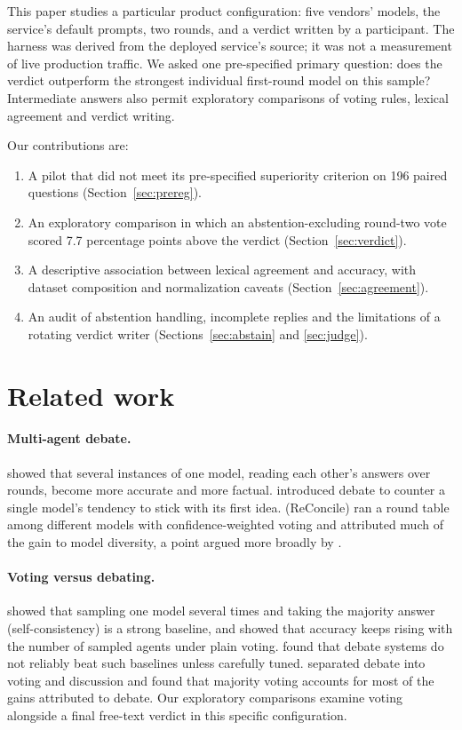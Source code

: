 \documentclass[11pt]{article}
\begin{document}
This paper studies a particular product configuration: five vendors' models, the service's default prompts, two rounds, and a verdict written by a participant. The harness was derived from the deployed service's source; it was not a measurement of live production traffic. We asked one pre-specified primary question: does the verdict outperform the strongest individual first-round model on this sample? Intermediate answers also permit exploratory comparisons of voting rules, lexical agreement and verdict writing.

Our contributions are:
\begin{enumerate}
  \item A pilot that did not meet its pre-specified superiority criterion on 196 paired questions (Section~\ref{sec:prereg}).
  \item An exploratory comparison in which an abstention-excluding round-two vote scored 7.7 percentage points above the verdict (Section~\ref{sec:verdict}).
  \item A descriptive association between lexical agreement and accuracy, with dataset composition and normalization caveats (Section~\ref{sec:agreement}).
  \item An audit of abstention handling, incomplete replies and the limitations of a rotating verdict writer (Sections~\ref{sec:abstain} and \ref{sec:judge}).
\end{enumerate}

\section{Related work}

\paragraph{Multi-agent debate.} \citet{du2023} showed that several instances of one model, reading each other's answers over rounds, become more accurate and more factual. \citet{liang2023} introduced debate to counter a single model's tendency to stick with its first idea. \citet{chen2024reconcile} (ReConcile) ran a round table among different models with confidence-weighted voting and attributed much of the gain to model diversity, a point argued more broadly by \citet{zhang2025stop}.

\paragraph{Voting versus debating.} \citet{wang2023sc} showed that sampling one model several times and taking the majority answer (self-consistency) is a strong baseline, and \citet{li2024more} showed that accuracy keeps rising with the number of sampled agents under plain voting. \citet{smit2024} found that debate systems do not reliably beat such baselines unless carefully tuned. \citet{choi2025} separated debate into voting and discussion and found that majority voting accounts for most of the gains attributed to debate. Our exploratory comparisons examine voting alongside a final free-text verdict in this specific configuration.
\end{document}
